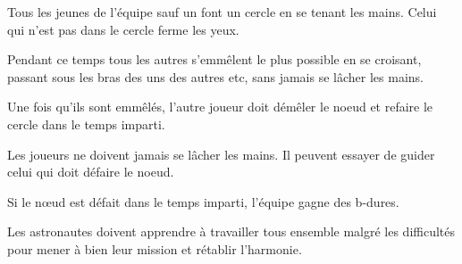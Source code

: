 \documentclass{grand-jeu}
\begin{document}
\begin{regles}
Tous les jeunes de l'équipe sauf un font un cercle en se tenant les mains. Celui qui n'est pas dans le cercle ferme les yeux. 

Pendant ce temps tous les autres s'emmêlent le plus possible en se croisant, passant sous les bras des uns des autres etc, sans jamais se lâcher les mains. 

Une fois qu'ils sont emmêlés, l'autre joueur doit démêler le noeud et refaire le cercle dans le temps imparti.

Les joueurs ne doivent jamais se lâcher les mains. Il peuvent essayer de guider celui qui doit défaire le noeud. 

Si le nœud est défait dans le temps imparti, l'équipe gagne des b-dures. 
\end{regles}

\begin{imaginaire}
Les astronautes doivent apprendre à travailler tous ensemble malgré les difficultés pour mener à bien leur mission et rétablir l'harmonie.
\end{imaginaire}

\begin{moments-stop}
\end{moments-stop}
\end{document}
